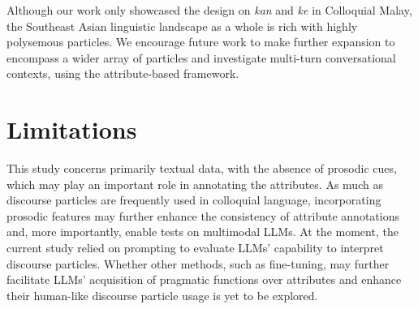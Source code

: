 \documentclass[11pt]{article}
\begin{document}
Although our work only showcased the design on \textit{kan} and \textit{ke} in Colloquial Malay, the Southeast Asian linguistic landscape as a whole is rich with highly polysemous particles. We encourage future work to make further expansion to encompass a wider array of particles and investigate multi-turn conversational contexts, using the attribute-based framework. 

\section*{Limitations}
This study concerns primarily textual data, with the absence of prosodic cues, which may play an important role in annotating the attributes. As much as discourse particles are frequently used in colloquial language, incorporating prosodic features may further enhance the consistency of attribute annotations and, more importantly, enable tests on multimodal LLMs. At the moment, the current study relied on prompting to evaluate LLMs' capability to interpret discourse particles. Whether other methods, such as fine-tuning, may further facilitate LLMs' acquisition of pragmatic functions over attributes and enhance their human-like discourse particle usage is yet to be explored. 



\end{document}

